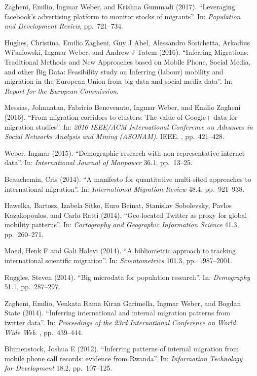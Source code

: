 \documentclass[
  12pt,
]{article}
\begin{document}
Zagheni, Emilio, Ingmar Weber, and Krishna Gummadi (2017). ``Leveraging
facebook's advertising platform to monitor stocks of migrants''. In:
\emph{Population and Development Review}, pp.~721--734.

Hughes, Christina, Emilio Zagheni, Guy J Abel, Alessandro Sorichetta,
Arkadius Wi'sniowski, Ingmar Weber, and Andrew J Tatem (2016).
``Inferring Migrations: Traditional Methods and New Approaches based on
Mobile Phone, Social Media, and other Big Data: Feasibility study on
Inferring (labour) mobility and migration in the European Union from big
data and social media data''. In:
\emph{Report for the European Commission}.

Messias, Johnnatan, Fabricio Benevenuto, Ingmar Weber, and Emilio
Zagheni (2016). ``From migration corridors to clusters: The value of
Google+ data for migration studies''. In:
\emph{2016 IEEE/ACM International Conference on Advances in Social Networks Analysis and Mining (ASONAM)}.
IEEE. , pp.~421--428.

Weber, Ingmar (2015). ``Demographic research with non-representative
internet data''. In: \emph{International Journal of Manpower} 36.1,
pp.~13--25.

Beauchemin, Cris (2014). ``A manifesto for quantitative multi-sited
approaches to international migration''. In:
\emph{International Migration Review} 48.4, pp.~921--938.

Hawelka, Bartosz, Izabela Sitko, Euro Beinat, Stanislav Sobolevsky,
Pavlos Kazakopoulos, and Carlo Ratti (2014). ``Geo-located Twitter as
proxy for global mobility patterns''. In:
\emph{Cartography and Geographic Information Science} 41.3,
pp.~260--271.

Moed, Henk F and Gali Halevi (2014). ``A bibliometric approach to
tracking international scientific migration''. In: \emph{Scientometrics}
101.3, pp.~1987--2001.

Ruggles, Steven (2014). ``Big microdata for population research''. In:
\emph{Demography} 51.1, pp.~287--297.

Zagheni, Emilio, Venkata Rama Kiran Garimella, Ingmar Weber, and Bogdan
State (2014). ``Inferring international and internal migration patterns
from twitter data''. In:
\emph{Proceedings of the 23rd International Conference on World Wide Web}.
, pp.~439--444.

Blumenstock, Joshua E (2012). ``Inferring patterns of internal migration
from mobile phone call records: evidence from Rwanda''. In:
\emph{Information Technology for Development} 18.2, pp.~107--125.
\end{document}
